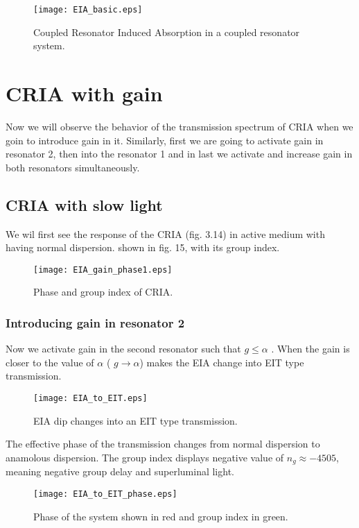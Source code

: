 \begin{figure}[h]
\centering
\texttt{[image: EIA\_basic.eps]}
\caption{Coupled Resonator Induced Absorption in a coupled resonator system.}
\end{figure}
  

\section{CRIA with gain}
Now we will observe the behavior of the transmission spectrum of CRIA when we goin to introduce gain in it. Similarly, first we are going to activate gain in resonator 2, then into the resonator 1 and in last we activate and increase gain in both resonators simultaneously. 

\subsection{CRIA with slow light}
We wil first see the response of the CRIA (fig. 3.14) in active medium with having normal dispersion. shown in fig. 15, with its group index.

\begin{figure}[h]
\centering
\texttt{[image: EIA\_gain\_phase1.eps]}
\caption{Phase and group index of CRIA.}
\end{figure}
  
\subsubsection{Introducing gain in resonator 2}
Now we activate gain in the second resonator such that $g \leqslant \alpha$ .  When the gain is closer to the value of $\alpha$ ( $g \to \alpha$) makes the EIA change into EIT type transmission.

\begin{figure}[h]
\centering
\texttt{[image: EIA\_to\_EIT.eps]}
\caption{EIA dip changes into an EIT type transmission.}
\end{figure}

The effective phase of the transmission changes from normal dispersion to anamolous dispersion. The group index displays negative value of $n_{g} \approx -4505$, meaning negative group delay and superluminal light.

\begin{figure}[h]
\centering
\texttt{[image: EIA\_to\_EIT\_phase.eps]}
\caption{Phase of the system shown in red and group index in green.}
\end{figure}

